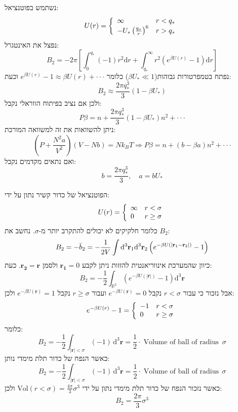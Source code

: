 \documentclass{tstextbook}
\begin{document}
\begin{example}
נשתמש בפוטנציאל:
$$U(r)=\left\{\begin{array}{l l}{{\infty}}&{{r<q_{*}}}\\ {{-U_{*}\left({\frac{q_{*}}{r}}\right)^{6}}}&{{r>q_{*}}}\end{array}\right.$$
נפצל את האינטגרל:
$$B_{2}=-2\pi\left[\int_{0}^{q_{*}}(-1)r^{2}\mathrm{d}r+\int_{q_{*}}^{\infty}r^{2}\left(e^{\beta U(r)}-1\right)\mathrm{d}r\right]$$
נפתח בטמפרטורות גבוהות(\(\beta U_{*}\ll 1\)) כלומר \(e^{\beta U(r)}-1\approx\beta U(r)+\cdot\cdot\cdot\) וכעת:
$$B_{2}\approx\frac{2\pi q_{*}^{3}}{3}(1-\beta U_{*})$$
ולכן אם נציב בפיתוח הווראלי נקבל:
$$P\beta=n+\frac{2\pi q_{*}^{3}}{3}(1-\beta U_{*})n^{2}+\cdot\cdot\cdot$$
ניתן להשוואות את זה למשוואה המורכת:
$$\left(P+\frac{N^{2}a}{V^{2}}\right)(V-N b)=N k_{B}T\Rightarrow P\beta=n+(b-\beta a)n^{2}+\cdot\cdot\cdot$$
ואם נתאים מקדמים נקבל:
$$b=\frac{2\pi q_{*}^{3}}{3},\quad a=b U_{*}$$

\end{example}
\begin{example}
הפוטנציאל של כדור קשיר נתון על ידי:
$$U(r)=\left\{\begin{array}{l l}{{\infty}}&{{r<\sigma}}\\ {{0}}&{{r\ge\sigma}}\end{array}\right.
$$
כלומר חלקיקים לא יכולים להתקרב יותר מ-\(\sigma\). נחשב את \(B_{2}\): 
$$B_{2}=-\bar{b}_{2}=-\frac{1}{2V}\int\mathrm{d}^{3}{\bf r}_{1}\mathrm{d}^{3}{\bf r}_{2}\left(e^{-\beta U\left(|{\bf r}_{1}-{\bf r}_{2}|\right)}-1\right)$$
כיוון שהמערכת אינווריאנטית להזזות ניתן לקבע \(\mathbf{r_{1}}=0\) ולסמן \(\mathbf{r_{2}}=\mathbf{r}\). כעת:
$$B_{2}=-{\frac{1}{2}}\int_{\mathbb{R}^{3}}\left(e^{-\beta U\left(|\mathbf{r}|\right)}-1\right)\mathrm{d}^{3}\mathbf{r}$$
אבל נזכור כי עבור \(r<\sigma\) נקבל \(e^{ -\beta U\left( \mathbf{r} \right) }=0\) ועבור \(r\geq \sigma\) נקבל \(e^{ -\beta U\left( \mathbf{r} \right) }=1\) ולכן:
$$e^{-\beta U(r)}-1=\left\{{\begin{array}{l l}{-1}&{r<\sigma}\\ {0}&{r\geq\sigma}\end{array}}\right.$$
כלומר:
$$B_{2}=-{\frac{1}{2}}\int_{|\mathbf{r}|<\sigma}(-1)\,\mathrm{d}^{3}\mathbf{r}={\frac{1}{2}}\cdot\operatorname{Volume~of~ball~of~radius}~\sigma$$
כאשר הנפח של כדור תלת מימדי נותן:
$$B_{2}=-{\frac{1}{2}}\int_{|\mathbf{r}|<\sigma}(-1)\,\mathrm{d}^{3}\mathbf{r}={\frac{1}{2}}\cdot\operatorname{Volume~of~ball~of~radius}\,\sigma$$
כאשר נזכור הנפח של כדור תלת מימדי נתון על ידי \(\mathrm{Vol}(r<\sigma)=\frac{4\pi}{3}\sigma^{3}\) ולכן:
$$B_{2}=\frac{2\pi}{3}\sigma^{3}$$

\end{example}
\end{document}
